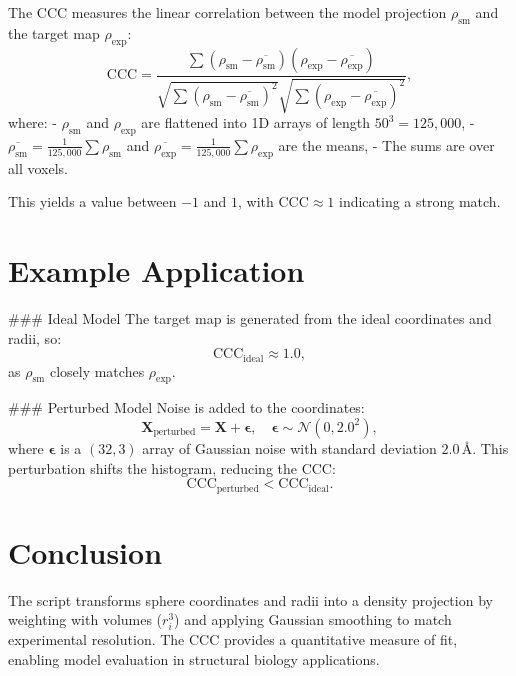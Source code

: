 \documentclass{article}
\begin{document}
The CCC measures the linear correlation between the model projection \( \rho_{\text{sm}} \) and the target map \( \rho_{\text{exp}} \):
\[
\text{CCC} = \frac{\sum (\rho_{\text{sm}} - \overline{\rho_{\text{sm}}})(\rho_{\text{exp}} - \overline{\rho_{\text{exp}}})}{\sqrt{\sum (\rho_{\text{sm}} - \overline{\rho_{\text{sm}}})^2} \sqrt{\sum (\rho_{\text{exp}} - \overline{\rho_{\text{exp}}})^2}},
\]
where:
- \( \rho_{\text{sm}} \) and \( \rho_{\text{exp}} \) are flattened into 1D arrays of length \( 50^3 = 125,000 \),
- \( \overline{\rho_{\text{sm}}} = \frac{1}{125,000} \sum \rho_{\text{sm}} \) and \( \overline{\rho_{\text{exp}}} = \frac{1}{125,000} \sum \rho_{\text{exp}} \) are the means,
- The sums are over all voxels.

This yields a value between \(-1\) and \(1\), with \( \text{CCC} \approx 1 \) indicating a strong match.

\section{Example Application}

### Ideal Model
The target map is generated from the ideal coordinates and radii, so:
\[
\text{CCC}_{\text{ideal}} \approx 1.0,
\]
as \( \rho_{\text{sm}} \) closely matches \( \rho_{\text{exp}} \).

### Perturbed Model
Noise is added to the coordinates:
\[
\mathbf{X}_{\text{perturbed}} = \mathbf{X} + \boldsymbol{\epsilon}, \quad \boldsymbol{\epsilon} \sim \mathcal{N}(0, 2.0^2),
\]
where \( \boldsymbol{\epsilon} \) is a \( (32, 3) \) array of Gaussian noise with standard deviation \( 2.0 \, \text{\AA} \). This perturbation shifts the histogram, reducing the CCC:
\[
\text{CCC}_{\text{perturbed}} < \text{CCC}_{\text{ideal}}.
\]

\section{Conclusion}

The script transforms sphere coordinates and radii into a density projection by weighting with volumes (\( r_i^3 \)) and applying Gaussian smoothing to match experimental resolution. The CCC provides a quantitative measure of fit, enabling model evaluation in structural biology applications.
\end{document}
